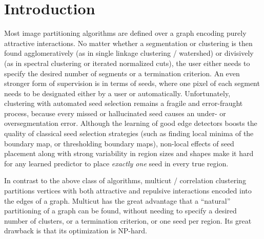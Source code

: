\section{Introduction}\label{intro}
Most image partitioning algorithms are defined over a graph encoding purely attractive interactions. No matter whether a segmentation or clustering is then found agglomeratively (as in single linkage clustering / watershed) or divisively (as in spectral clustering or iterated normalized cuts), the user either needs to specify the desired number of segments or a termination criterion. An even stronger form of supervision is in terms of seeds, where one pixel of each segment needs to be designated either by a user or automatically. Unfortunately, clustering with 
automated seed selection remains a fragile and error-fraught process, because every missed or hallucinated seed causes an under- or oversegmentation error. Although the learning of good edge detectors boosts the quality of classical seed selection strategies (such as finding local minima of the boundary map, or thresholding boundary maps), non-local effects of seed placement along with strong variability in region sizes and shapes make it hard for any learned predictor to place {\em exactly one} seed in every true region.

In contrast to the above class of algorithms, multicut / correlation clustering partitions vertices with both attractive and repulsive interactions encoded into the edges of a graph. Multicut has the great advantage that a ``natural'' partitioning of a graph can be found, without needing to specify a  desired number of clusters, or a termination criterion, or one seed per region. Its great drawback is that its optimization is NP-hard. 

